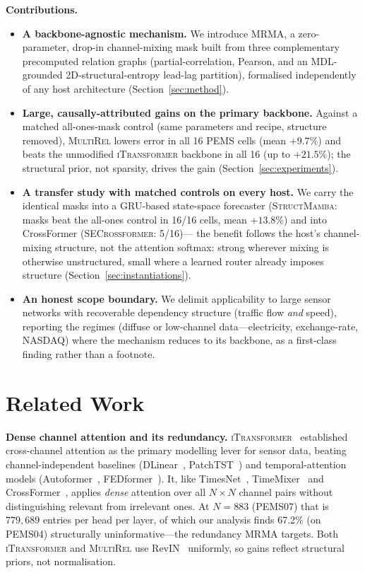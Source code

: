 \documentclass[letterpaper]{article}   %
\newcommand{\mr}{\textsc{MultiRel}}
\newcommand{\itrans}{\textsc{iTransformer}}
\begin{document}
\medskip
\noindent\textbf{Contributions.}
\begin{itemize}
  \item \textbf{A backbone-agnostic mechanism.} We introduce MRMA, a
        zero-parameter, drop-in channel-mixing mask built from three
        complementary precomputed relation graphs (partial-correlation, Pearson,
        and an MDL-grounded 2D-structural-entropy lead-lag partition), formalised
        independently of any host architecture (Section~\ref{sec:method}).
  \item \textbf{Large, causally-attributed gains on the primary backbone.}
        Against a matched all-ones-mask control (same parameters and recipe,
        structure removed), \mr{} lowers error in all 16 PEMS cells (mean
        $+9.7\%$) and beats the unmodified \itrans{} backbone in all 16 (up to
        $+21.5\%$); the structural prior, not sparsity, drives the gain
        (Section~\ref{sec:experiments}).
  \item \textbf{A transfer study with matched controls on every host.} We carry
        the identical masks into a GRU-based state-space forecaster
        (\textsc{StructMamba}: masks beat the all-ones control in 16/16 cells,
        mean $+13.8\%$) and into CrossFormer (\textsc{SECrossformer}: 5/16)---
        the benefit follows the host's channel-mixing structure, not the
        attention softmax: strong wherever mixing is otherwise unstructured,
        small where a learned router already imposes structure
        (Section~\ref{sec:instantiations}).
  \item \textbf{An honest scope boundary.} We delimit applicability to large
        sensor networks with recoverable dependency structure (traffic flow
        \emph{and} speed), reporting the regimes (diffuse or low-channel
        data---electricity, exchange-rate, NASDAQ) where the mechanism reduces
        to its backbone, as a first-class finding rather than a footnote.
\end{itemize}

\section{Related Work}
\label{sec:related}

\textbf{Dense channel attention and its redundancy.}
\itrans{}~\cite{liu2023itransformer} established cross-channel attention as the
primary modelling lever for sensor data, beating channel-independent baselines
(DLinear~\cite{zeng2023transformers}, PatchTST~\cite{nie2022time}) and temporal-attention
models (Autoformer~\cite{wu2021autoformer}, FEDformer~\cite{zhou2022fedformer}).
It, like TimesNet~\cite{wu2023timesnet}, TimeMixer~\cite{wang2024timemixer} and
CrossFormer~\cite{zhang2023crossformer}, applies \emph{dense} attention over all
$N{\times}N$ channel pairs without distinguishing relevant from irrelevant ones. At
$N{=}883$ (PEMS07) that is $779{,}689$ entries per head per layer, of which our
analysis finds 67.2\% (on PEMS04) structurally uninformative---the redundancy MRMA
targets. Both \itrans{} and \mr{} use RevIN~\cite{kim2022reversible} uniformly, so
gains reflect structural priors, not normalisation.
\end{document}
